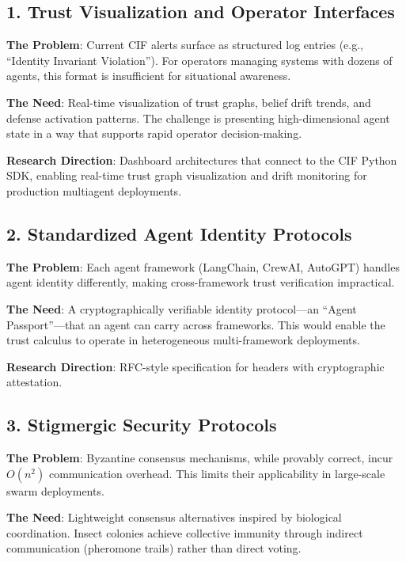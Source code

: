 \documentclass[
]{article}
\begin{document}
\subsection{1. Trust Visualization and Operator
Interfaces}\label{trust-visualization-and-operator-interfaces}

\textbf{The Problem}: Current CIF alerts surface as structured log
entries (e.g., ``Identity Invariant Violation''). For operators managing
systems with dozens of agents, this format is insufficient for
situational awareness.

\textbf{The Need}: Real-time visualization of trust graphs, belief drift
trends, and defense activation patterns. The challenge is presenting
high-dimensional agent state in a way that supports rapid operator
decision-making.

\textbf{Research Direction}: Dashboard architectures that connect to the
CIF Python SDK, enabling real-time trust graph visualization and drift
monitoring for production multiagent deployments.

\subsection{2. Standardized Agent Identity
Protocols}\label{standardized-agent-identity-protocols}

\textbf{The Problem}: Each agent framework (LangChain, CrewAI, AutoGPT)
handles agent identity differently, making cross-framework trust
verification impractical.

\textbf{The Need}: A cryptographically verifiable identity protocol---an
``Agent Passport''---that an agent can carry across frameworks. This
would enable the trust calculus to operate in heterogeneous
multi-framework deployments.

\textbf{Research Direction}: RFC-style specification for
 headers with cryptographic attestation.

\subsection{3. Stigmergic Security
Protocols}\label{stigmergic-security-protocols}

\textbf{The Problem}: Byzantine consensus mechanisms, while provably
correct, incur \(O(n^2)\) communication overhead. This limits their
applicability in large-scale swarm deployments.

\textbf{The Need}: Lightweight consensus alternatives inspired by
biological coordination. Insect colonies achieve collective immunity
through indirect communication (pheromone trails) rather than direct
voting.
\end{document}
